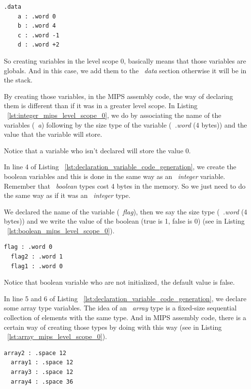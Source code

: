 \documentclass[
  oneside,
  11pt, a4paper,
  footinclude=true,
  headinclude=true,
  cleardoublepage=empty
]{scrbook}
\begin{document}
\begin{lstlisting}[caption={Code generation of integer variables in MIPS assembly code},label={lst:integer_mips_level_scope_0}]
  .data
	a : .word 0		
	b : .word 4	
	c : .word -1		
	d : .word +2		
\end{lstlisting}

So creating variables in the level scope 0, basically means that those variables are globals.
And in this case, we add them to the ~\textit{data} section otherwise it will be in the stack.

By creating those variables, in the MIPS assembly code, the way of declaring them is different than if it was in a greater level scope.
In Listing ~\ref{lst:integer_mips_level_scope_0}, we do by associating the name of the variables (~\textit{a}) following by the size type of the variable (~\textit{.word} (4 bytes)) and  the value that the variable will store.

Notice that a variable who isn't declared will store the value 0.

In line 4 of Listing ~\ref{lst:declaration_variable_code_generation}, we create the boolean variables and this is done in the same way as an ~\textit{integer} variable.
Remember that ~\textit{boolean} types cost 4 bytes in the memory. So we just need to do the same way as if it was an ~\textit{integer} type.

We declared the name of the variable (~\textit{flag}), then we say the size type (~\textit{.word} (4 bytes)) and we write the value of the boolean (true is 1, false is 0) (see in Listing ~\ref{lst:boolean_mips_level_scope_0}).

\begin{lstlisting}[caption={Code generation of boolean variables in MIPS assembly code},label={lst:boolean_mips_level_scope_0}]
  flag : .word 0		
  flag2 : .word 1		
  flag1 : .word 0		
\end{lstlisting}

Notice that boolean variable who are not initialized, the default value is false.

In line 5 and 6 of Listing ~\ref{lst:declaration_variable_code_generation}, we declare some array type variables.
The idea of an ~\textit{array} type is a fixed-size sequential collection of elements with the same type. 
And in MIPS assembly code, there is a certain way of creating those types by doing with this way (see in Listing ~\ref{lst:array_mips_level_scope_0}).

\begin{lstlisting}[caption={Code generation of array variables in MIPS assembly code},label={lst:array_mips_level_scope_0}]
  array2 : .space 12		
  array1 : .space 12		
  array3 : .space 12		
  array4 : .space 36		
\end{lstlisting}
\end{document}
